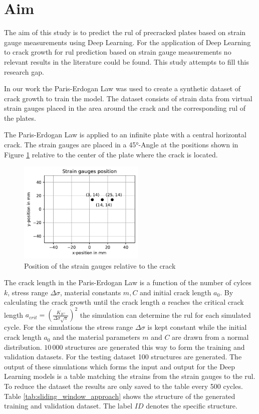 \documentclass[conference]{IEEEtran}
\begin{document}
\section{Aim}
\label{sec:aim}

The aim of this study is to predict the \gls{rul} of precracked plates based on strain gauge measurements using Deep Learning. 
For the application of Deep Learning to crack growth for \gls{rul} prediction based on strain gauge measurements no relevant results in the literature could be found. This study attempts to fill this research gap.

In our work the Paris-Erdogan Law \cite{Paris1963} was used to create a synthetic dataset of crack growth to train the model. The dataset consists of strain data from virtual strain gauges placed in the area around the crack and the corresponding \gls{rul} of the plates.

The Paris-Erdogan Law is applied to an infinite plate with a central horizontal crack. The strain gauges are placed in a 45°-Angle at the positions shown in Figure \ref{fig:strain_gauge_positions} relative to the center of the plate where the crack is located.

\begin{figure}[htp]
	\centering
	\includegraphics[width=6cm]{python/strain_gauges_position.pdf}
	\caption{Position of the strain gauges relative to the crack}
	\label{fig:strain_gauge_positions}
\end{figure}

The crack length in the Paris-Erdogan Law is a function of the number of cylces $k$, stress range $\Delta \sigma$, material constants $m, C$ and initial crack length $a_0$. By calculating the crack growth until the crack length $a$ reaches the critical crack length $a_{crit}=(\frac{K_{IC}}{\Delta \sigma \sqrt{\pi}})^2$ the simulation can determine the \gls{rul} for each simulated cycle. For the simulations the stress range $\Delta \sigma$ is kept constant while the initial crack length $a_0$ and the material parameters $m$ and $C$ are drawn from a normal distribution. $ 10\,000 $ structures are generated this way to form the training and validation datasets. For the testing dataset 100 structures are generated. The output of these simulations which forms the input and output for the Deep Learning models is a table matching the strains from the strain gauges to the \gls{rul}. To reduce the dataset the results are only saved to the table every 500 cycles. Table \ref{tab:sliding_window_approach} shows the structure of the generated training and validation dataset. The label $ ID $ denotes the specific structure.
\end{document}
